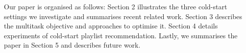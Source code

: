 Our paper is organised as follows:
Section 2 illustrates the three cold-start settings we investigate and summarises recent related work.
Section 3 describes the multitask objective and approaches to optimise it.
Section 4 details experiments of cold-start playlist recommendation. %
Lastly, we summarises the paper in Section 5 and describes future work.
